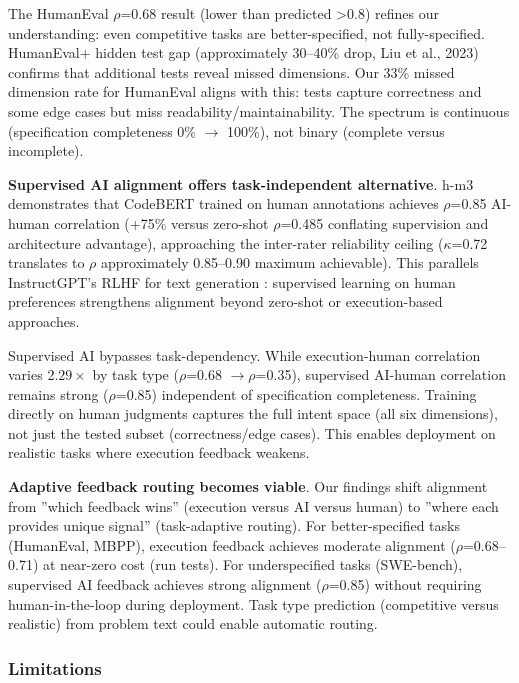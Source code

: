 The HumanEval $\rho$=0.68 result (lower than predicted >0.8) refines our understanding: even competitive tasks are better-specified, not fully-specified. HumanEval+ hidden test gap (approximately 30--40\% drop, Liu et al., 2023) confirms that additional tests reveal missed dimensions. Our 33\% missed dimension rate for HumanEval aligns with this: tests capture correctness and some edge cases but miss readability/maintainability. The spectrum is continuous (specification completeness 0\% $\rightarrow$ 100\%), not binary (complete versus incomplete).

\textbf{Supervised AI alignment offers task-independent alternative}. h-m3 demonstrates that CodeBERT trained on human annotations achieves $\rho$=0.85 AI-human correlation (+75\% versus zero-shot $\rho$=0.485 conflating supervision and architecture advantage), approaching the inter-rater reliability ceiling ($\kappa$=0.72 translates to $\rho$ approximately 0.85--0.90 maximum achievable). This parallels InstructGPT's RLHF for text generation \citep{ouyang2022training}: supervised learning on human preferences strengthens alignment beyond zero-shot or execution-based approaches.

Supervised AI bypasses task-dependency. While execution-human correlation varies 2.$29\times$ by task type ($\rho$=0.68 $\rightarrow \rho$=0.35), supervised AI-human correlation remains strong ($\rho$=0.85) independent of specification completeness. Training directly on human judgments captures the full intent space (all six dimensions), not just the tested subset (correctness/edge cases). This enables deployment on realistic tasks where execution feedback weakens.

\textbf{Adaptive feedback routing becomes viable}. Our findings shift alignment from ''which feedback wins'' (execution versus AI versus human) to ''where each provides unique signal'' (task-adaptive routing). For better-specified tasks (HumanEval, MBPP), execution feedback achieves moderate alignment ($\rho$=0.68--0.71) at near-zero cost (run tests). For underspecified tasks (SWE-bench), supervised AI feedback achieves strong alignment ($\rho$=0.85) without requiring human-in-the-loop during deployment. Task type prediction (competitive versus realistic) from problem text could enable automatic routing.

\subsubsection{Limitations}

